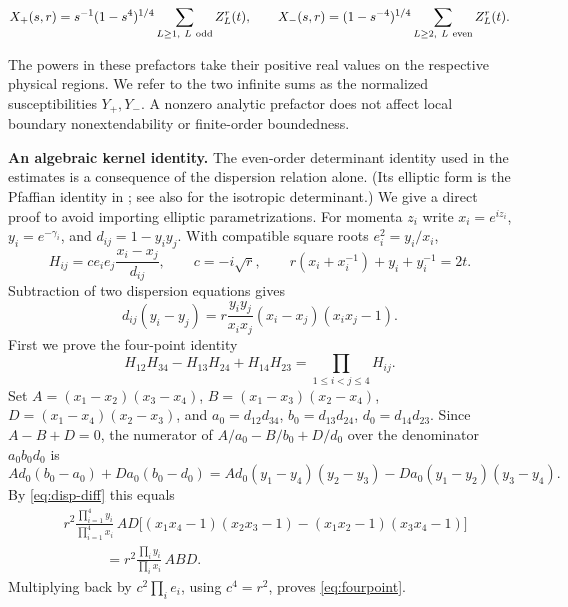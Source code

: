 \documentclass[11pt,a4paper]{article}
\numberwithin{equation}{section}
\theoremstyle{plain}
\theoremstyle{definition}
\begin{document}
\begin{equation}
X_+(s,r)=s^{-1}(1-s^4)^{1/4}\sum_{L\ge1,\ L\ {\rm odd}} Z_L^r(t),\qquad X_-(s,r)=(1-s^{-4})^{1/4}\sum_{L\ge2,\ L\ {\rm even}} Z_L^r(t).
\label{eq:A4}
\end{equation}

The powers in these prefactors take their positive real values on the respective physical regions. We refer to the two infinite sums as the normalized susceptibilities \(Y_+,Y_-\). A nonzero analytic prefactor does not affect local boundary nonextendability or finite-order boundedness.

\textbf{An algebraic kernel identity.} The even-order determinant identity used in the estimates is a consequence of the dispersion relation alone. (Its elliptic form is the Pfaffian identity in \cite[eqs.~(5.8), (6.4)]{iol}; see also \cite[Appendix A]{twsing} for the isotropic determinant.) We give a direct proof to avoid importing elliptic parametrizations. For momenta $z_i$ write $x_i=e^{iz_i}$, $y_i=e^{-\gamma_i}$, and $d_{ij}=1-y_i y_j$. With compatible square roots $e_i^2=y_i/x_i$,
\[
H_{ij}=c e_i e_j\frac{x_i-x_j}{d_{ij}},\qquad c=-i\sqrt r,\qquad r(x_i+x_i^{-1})+y_i+y_i^{-1}=2t.
\]
Subtraction of two dispersion equations gives
\begin{equation}
d_{ij}(y_i-y_j)=r\frac{y_i y_j}{x_i x_j}(x_i-x_j)(x_ix_j-1).\label{eq:disp-diff}
\end{equation}
First we prove the four-point identity
\begin{equation}
H_{12}H_{34}-H_{13}H_{24}+H_{14}H_{23}=\prod_{1\le i<j\le4}H_{ij}.\label{eq:fourpoint}
\end{equation}
Set $A=(x_1-x_2)(x_3-x_4)$, $B=(x_1-x_3)(x_2-x_4)$, $D=(x_1-x_4)(x_2-x_3)$, and $a_0=d_{12}d_{34}$, $b_0=d_{13}d_{24}$, $d_0=d_{14}d_{23}$. Since $A-B+D=0$, the numerator of $A/a_0-B/b_0+D/d_0$ over the denominator $a_0b_0d_0$ is
\[
A d_0(b_0-a_0)+D a_0(b_0-d_0)
=A d_0(y_1-y_4)(y_2-y_3)-D a_0(y_1-y_2)(y_3-y_4).
\]
By \eqref{eq:disp-diff} this equals
\begin{align*}
&r^2\frac{\prod_{i=1}^4 y_i}{\prod_{i=1}^4 x_i}\,AD
 \bigl[(x_1x_4-1)(x_2x_3-1)-(x_1x_2-1)(x_3x_4-1)\bigr]\\
&\hspace{3em}=r^2\frac{\prod_i y_i}{\prod_i x_i}\,ABD.
\end{align*}
Multiplying back by $c^2\prod_i e_i$, using $c^4=r^2$, proves \eqref{eq:fourpoint}.
\end{document}
